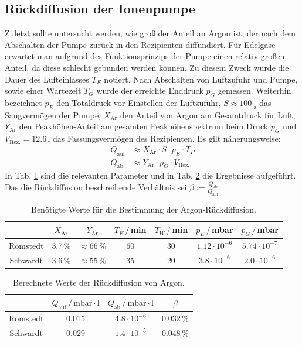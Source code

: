 \documentclass[german, parskip=full]{scrartcl}
\newcommand{\tecxt}{}
\begin{document}
\subsection{Rückdiffusion der Ionenpumpe}
Zuletzt sollte untersucht werden, wie groß der Anteil an Argon ist, der nach dem Abschalten der Pumpe zurück in den Rezipienten diffundiert. Für Edelgase erwartet man aufgrund des Funktionsprinzips der Pumpe einen relativ großen Anteil, da diese schlecht gebunden werden können. Zu diesem Zweck wurde die Dauer des Lufteinlasses $T_E$ notiert. Nach Abschalten von Luftzufuhr und Pumpe, sowie einer Wartezeit $T_G$ wurde der erreichte Enddruck $p_G$ gemessen. Weiterhin bezeichnet $p_E$ den Totaldruck vor Einstellen der Luftzufuhr, $S\approx 100\,\frac{\tecxt\text{l}}{\tecxt\text{s}}$ das Saugvermögen der Pumpe, $X_\tecxt\text{Ar}$ den Anteil von Argon am Gesamtdruck für Luft, $Y_\tecxt\text{Ar}$ den Peakhöhen-Anteil am gesamten Peakhöhenspektrum beim Druck $p_G$ und $V_\tecxt\text{Rez.}=12.6\,$l das Fassungsvermögen des Rezipienten. Es gilt näherungsweise:
\begin{align*}
Q_\tecxt\text{auf}&\approx X_\tecxt\text{Ar}\cdot S\cdot p_E\cdot T_P\\ 
Q_\tecxt\text{ab}&\approx Y_\tecxt\text{Ar}\cdot p_G\cdot V_\tecxt\text{Rez.}
\end{align*}
In Tab. \ref{table:werte fuer argondiffusion} sind die relevanten Parameter und in Tab. \ref{table:argondiffusion} die Ergebnisse aufgeführt. Das die Rückdiffusion beschreibende Verhältnis sei $\beta:=\frac{Q_\tecxt\text{ab}}{Q_\tecxt\text{auf}}$.
\begin{table}[h!]
\centering
\begin{tabular}{c|c|c|c|c|c|c}
&$X_\tecxt\text{Ar}$&$Y_\tecxt\text{Ar}$&$T_E\,/\,$min&$T_W\,/\,$min&$p_E\,/\,$mbar&$p_G\,/\,$mbar\\ \hline
Romstedt&3.7\,\%&$\approx 66$\,\%&60&30&$1.12\cdot 10^{-6}$&$5.74\cdot 10^{-7}$\\ \hline
Schwardt&3.6\,\%&$\approx 55$\,\%&35&20&$3.8\cdot 10^{-6}$&$2.0\cdot 10^{-6}$\\
\end{tabular}
\caption{Benötigte Werte für die Bestimmung der Argon-Rückdiffusion.}
\label{table:werte fuer argondiffusion}
\end{table}
\begin{table}[h!]
\centering
\begin{tabular}{c|c|c|c}
&$Q_\tecxt\text{auf}\,/\,\tecxt\text{mbar}\cdot\tecxt\text{l}$&$Q_\tecxt\text{ab}\,/\,\tecxt\text{mbar}\cdot\tecxt\text{l}$&$\beta$\\ \hline
Romstedt&0.015&$4.8\cdot 10^{-6}$&0.032\,\%\\ \hline
Schwardt&0.029&$1.4\cdot 10^{-5}$&0.048\,\%\\
\end{tabular}
\caption{Berechnete Werte der Rückdiffusion von Argon.}
\label{table:argondiffusion}
\end{table}\\
\end{document}
